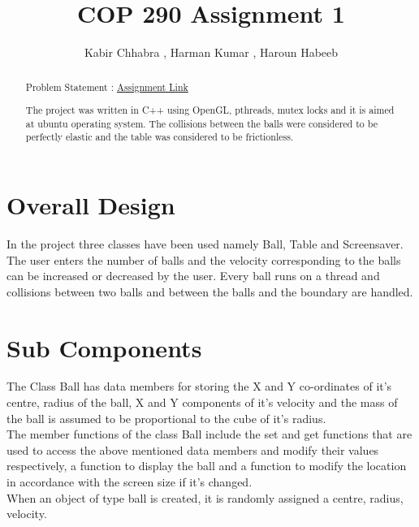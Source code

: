 \documentclass[]{article}
\begin{document}
\title{COP 290 Assignment 1}
\author{Kabir Chhabra , Harman Kumar , Haroun Habeeb}
\maketitle

\begin{abstract}
\begin{flushleft}
Problem Statement : \href { http://www.cse.iitd.ac.in/~prathmesh/ta/COP290/ass1.html }{Assignment Link}
\end{flushleft}

\begin{flushleft}
The project was written in C++ using OpenGL, pthreads, mutex locks and it is aimed at ubuntu operating system. The collisions between the balls were considered to be perfectly elastic and the table was considered to be frictionless.
\end{flushleft}

\end{abstract}

\section{Overall Design}
\begin{flushleft}
In the project three classes have been used namely Ball, Table and Screensaver. The user enters the number of balls and the velocity corresponding to the balls can be increased or decreased by the user. Every ball runs on a thread and collisions between two balls and between the balls and the boundary are handled.
\end{flushleft} 

\section{Sub Components}
\begin{flushleft}
The Class Ball has data members for storing the X and Y co-ordinates of it's centre, radius of the ball, X and Y components of it's velocity and the mass of the ball is assumed to be proportional to the cube of it's radius. 
\\
The member functions of the class Ball include the set and get functions that are used to access the above mentioned data members and modify their values respectively, a function to display the ball and a function to modify the location in accordance with the screen size if it's changed.
\\ 
When an object of type ball is created, it is randomly assigned a centre, radius, velocity.
\end{flushleft}
\end{document}
